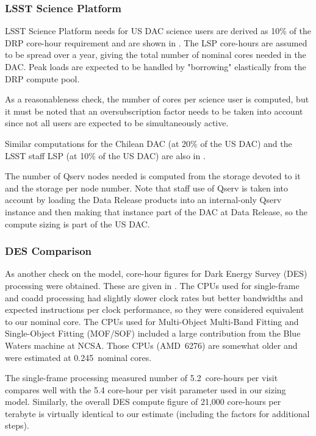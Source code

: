 \subsubsection{LSST Science Platform}

LSST Science Platform needs for US DAC science users are derived as 10\% of the DRP core-hour requirement and are shown in .
The LSP core-hours are assumed to be spread over a year, giving the total number of nominal cores needed in the DAC.
Peak loads are expected to be handled by "borrowing" elastically from the DRP compute pool.

As a reasonableness check, the number of cores per science user is computed, but it must be noted that an oversubscription factor needs to be taken into account since not all users are expected to be simultaneously active.

Similar computations for the Chilean DAC (at 20\% of the US DAC) and the LSST staff LSP (at 10\% of the US DAC) are also in .

The number of Qserv nodes needed is computed from the storage devoted to it and the storage per node number.
Note that staff use of Qserv is taken into account by loading the Data Release products into an internal-only Qserv instance and then making that instance part of the DAC at Data Release, so the compute sizing is part of the US DAC.



\subsubsection{DES Comparison}

As another check on the model, core-hour figures for Dark Energy Survey (DES) processing were obtained.
These are given in .
The CPUs used for single-frame and coadd processing had slightly slower clock rates but better bandwidths and expected instructions per clock performance, so they were considered equivalent to our nominal core.
The CPUs used for Multi-Object Multi-Band Fitting and Single-Object Fitting (MOF/SOF) included a large contribution from the Blue Waters machine at NCSA.
Those CPUs (AMD~6276) are somewhat older and were estimated at 0.245~nominal cores.

The single-frame processing measured number of 5.2~core-hours per visit compares well with the 5.4 core-hour per visit parameter used in our sizing model.
Similarly, the overall DES compute figure of 21,000 core-hours per terabyte is virtually identical to our estimate (including the factors for additional steps).

